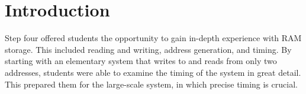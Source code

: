 \section{Introduction}

Step four offered students the opportunity to gain in-depth experience with RAM
storage.  This included reading and writing, address generation, and timing.
By starting with an elementary system that writes to and reads from only two
addresses, students were able to examine the timing of the system in great
detail.  This prepared them for the large-scale system, in which precise timing
is crucial.
